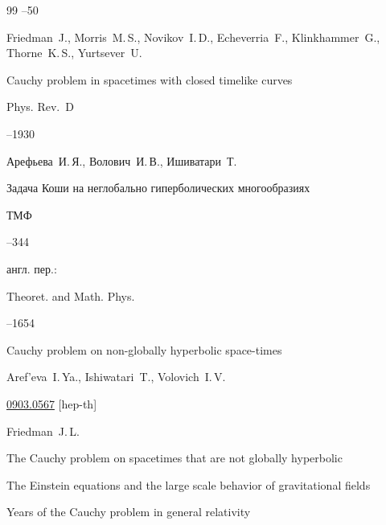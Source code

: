 \begin{thebibliography}{99}
–50






\by Friedman~J., Morris~M.\,S., Novikov~I.\,D., Echeverria~F., Klinkhammer~G., Thorne~K.\,S., Yurtsever~U.

\paper Cauchy problem in spacetimes with closed timelike curves

\jour Phys. Rev.~D




–1930







\by Арефьева~И.\,Я., Волович~И.\,В.,  Ишиватари~Т.

\paper Задача Коши на неглобально гиперболических многообразиях

\jour ТМФ




--344

\transl англ. пер.:~

\jour Theoret. and Math. Phys.




--1654

\paper Cauchy problem on non-globally hyperbolic space-times 

\by   Aref'eva~I.\,Ya., Ishiwatari~T., Volovich~I.\,V. 

\arxiv \href{http://arxiv.org/abs/0903.0567}{0903.0567}  [hep-th]






\by Friedman~J.\,L.

\paper The Cauchy problem on spacetimes that are not globally hyperbolic

\inbook The Einstein equations and the large scale behavior of gravitational fields

 Years of the Cauchy problem in general relativity


\end{thebibliography}

